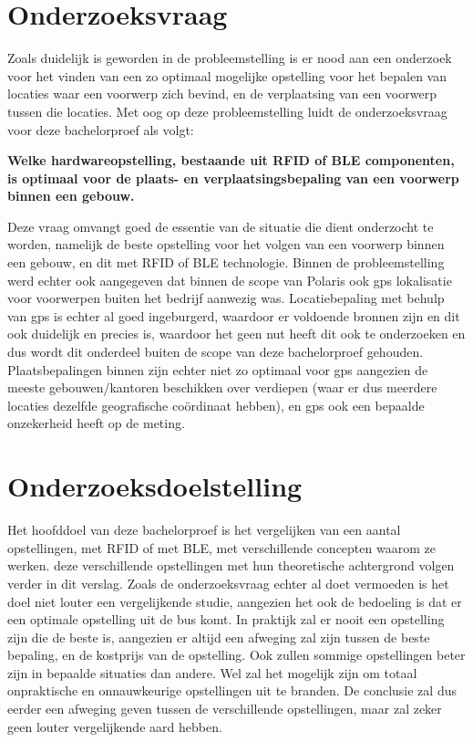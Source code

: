 \section{Onderzoeksvraag}
\label{sec:onderzoeksvraag}

Zoals duidelijk is geworden in de probleemstelling is er nood aan een onderzoek voor het vinden van een zo optimaal mogelijke opstelling voor het bepalen van locaties waar een voorwerp zich bevind, en de verplaatsing van een voorwerp tussen die locaties. Met oog op deze probleemstelling luidt de onderzoeksvraag voor deze bachelorproef als volgt:
\begin{center}
	\textbf{Welke hardwareopstelling, bestaande uit RFID of BLE componenten, is optimaal voor de plaats- en verplaatsingsbepaling van een voorwerp binnen een gebouw.}
\end{center}
Deze vraag omvangt goed de essentie van de situatie die dient onderzocht te worden, namelijk de beste opstelling voor het volgen van een voorwerp binnen een gebouw, en dit met RFID of BLE technologie. Binnen de probleemstelling werd echter ook aangegeven dat binnen de scope van Polaris ook gps lokalisatie voor voorwerpen buiten het bedrijf aanwezig was. Locatiebepaling met behulp van gps is echter al goed ingeburgerd, waardoor er voldoende bronnen zijn en dit ook duidelijk en precies is, waardoor het geen nut heeft dit ook te onderzoeken en dus wordt dit onderdeel buiten de scope van deze bachelorproef gehouden. Plaatsbepalingen binnen zijn echter niet zo optimaal voor gps aangezien de meeste gebouwen/kantoren beschikken over verdiepen (waar er dus meerdere locaties dezelfde geografische coördinaat hebben), en gps ook een bepaalde onzekerheid heeft op de meting.

\section{Onderzoeksdoelstelling}
\label{sec:onderzoeksdoelstelling}

Het hoofddoel van deze bachelorproef is het vergelijken van een aantal opstellingen, met RFID of met BLE, met verschillende concepten waarom ze werken. deze verschillende opstellingen met hun theoretische achtergrond volgen verder in dit verslag. Zoals de onderzoeksvraag echter al doet vermoeden is het doel niet louter een vergelijkende studie, aangezien het ook de bedoeling is dat er een optimale opstelling uit de bus komt. 
In praktijk zal er nooit een opstelling zijn die de beste is, aangezien er altijd een afweging zal zijn tussen de beste bepaling, en de kostprijs van de opstelling. Ook zullen sommige opstellingen beter zijn in bepaalde situaties dan andere. Wel zal het mogelijk zijn om totaal onpraktische en onnauwkeurige opstellingen uit te branden. De conclusie zal dus eerder een afweging geven tussen de verschillende opstellingen, maar zal zeker geen louter vergelijkende aard hebben.

